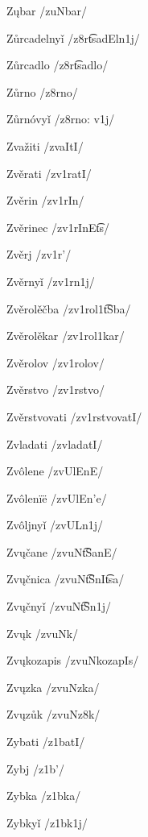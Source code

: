 Zųbar /zuNbar/

Zůrcadelnyǐ /z8r\t{ts}adEln1j/

Zůrcadlo /z8r\t{ts}adlo/

Zůrno /z8rno/

Zůrnóvyǐ /z8rno: v1j/

Zvažiti /zva\textctz ItI/


Zvěrati /zv1ratI/

Zvěrin /zv1rIn/

Zvěrinec /zv1rInE\t{ts}/

Zvěrj /zv1r’/

Zvěrnyǐ /zv1rn1j/

Zvěrolěčba /zv1rol1\t{tS}ba/

Zvěrolěkar /zv1rol1kar/

Zvěrolov /zv1rolov/

Zvěrstvo /zv1rstvo/

Zvěrstvovati /zv1rstvovatI/

Zvladati /zvladatI/

Zvôlene /zvUlEnE/

Zvôlenïë /zvUlEn’e/

Zvôljnyǐ /zvULn1j/

Zvųčane /zvuN\t{tS}anE/

Zvųčnica /zvuN\t{tS}nI\t{ts}a/

Zvųčnyǐ /zvuN\t{tS}n1j/

Zvųk /zvuNk/

Zvųkozapis /zvuNkozapIs/

Zvųzka /zvuNzka/

Zvųzůk /zvuNz8k/

Zybati /z1batI/

Zybj /z1b’/

Zybka /z1bka/

Zybkyǐ /z1bk1j/
